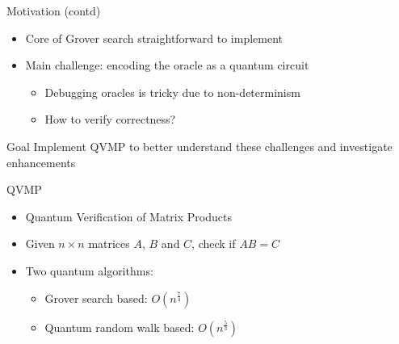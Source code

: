 \documentclass[10pt]{beamer}
\begin{document}
\begin{frame}{Motivation (contd)}
  \begin{itemize}
    \item Core of Grover search straightforward to implement
    \item {
      Main challenge: encoding the oracle as a quantum circuit
      \begin{itemize}
        \item Debugging oracles is tricky due to non-determinism
        \item How to verify correctness?
      \end{itemize}
    }
  \end{itemize}

  \begin{alertblock}{Goal}
    Implement QVMP to better understand these challenges and investigate
    enhancements
  \end{alertblock}
\end{frame}

\begin{frame}{QVMP}
  \begin{itemize}
    \item Quantum Verification of Matrix Products
    \item Given $n \times n$ matrices $A$, $B$ and $C$, check if $AB = C$
    \item {
        Two quantum algorithms:
        \begin{itemize}
          \item Grover search based: $O(n^{\frac{7}{4}})$
          \item Quantum random walk based: $O(n^{\frac{5}{3}})$
        \end{itemize}
    }
  \end{itemize}
\end{frame}
\end{document}
